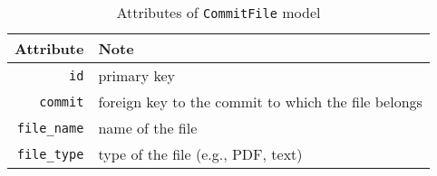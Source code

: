 \begin{table}[ht]
    \centering
    \caption{Attributes of \texttt{CommitFile} model}
    \label{tab:COMMIT_FILE_ATTR}
    \renewcommand{\arraystretch}{1.3}
    \begin{tabular}[ht]{r|l}
        \hline
        Attribute & Note \\
        \hline
        \hline
        \texttt{id} & primary key \\
        \hline
        \texttt{commit} & foreign key to the commit to which the file belongs \\
        \hline
        \texttt{file\_name} & name of the file \\
        \hline
        \texttt{file\_type} & type of the file (e.g., PDF, text) \\
        \hline
    \end{tabular}
\end{table}

